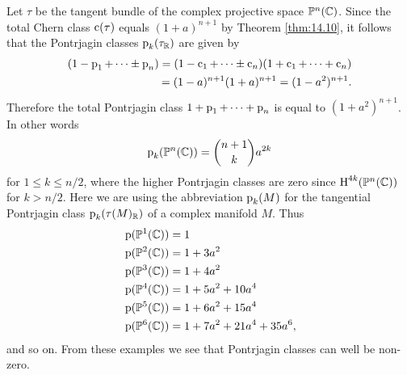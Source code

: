 \documentclass[../main]{subfiles}
\begin{document}
\begin{customexample}{15.6}
\label{ex:15.06}
Let $\tau$ be the tangent bundle of the complex projective space $\mathbb{P}^n(\mathbb C)$. Since the total Chern class $\operatorname{c}(\tau)$ equals $(1+a)^{n+1}$ by Theorem \ref{thm:14.10}, it follows that  the Pontrjagin classes $\operatorname{p}_k(\tau_\mathbb R)$ are given by \[\begin{split}(1-\operatorname{p}_1+\cdots \pm \operatorname{p}_n) = (1-\operatorname{c}_1 + \cdots \pm \operatorname{c}_n)(1+\operatorname{c}_1+\cdots+\operatorname{c}_n) \\ = (1-a)^{n+1}(1+a)^{n+1} = (1-a^2)^{n+1}. \end{split}\] Therefore the total Pontrjagin class $1+\operatorname{p}_1+\cdots+\operatorname{p}_n$ is equal to $(1+a^2)^{n+1}$. In other words 
\[\operatorname{p}_k(\mathbb{P}^n(\mathbb C)) = \binom{n+1}{k} a^{2k}\] for $1 \leq k \leq n/2$, where the higher Pontrjagin classes are zero since $\operatorname{H}^{4k}(\mathbb{P}^n(\mathbb C))$ for $k > n/2$. Here we are using the abbreviation $\operatorname{p}_k(M)$ for the tangential Pontrjagin class $\operatorname{p}_k(\tau(M)_\mathbb R)$ of a complex manifold $M$. Thus 
\[\begin{split} &\operatorname{p}(\mathbb{P}^1(\mathbb C)) = 1 \\ &\operatorname{p}(\mathbb{P}^2(\mathbb C)) = 1 +3a^2 \\ &\operatorname{p}(\mathbb{P}^3(\mathbb C)) = 1 + 4a^2 \\ &\operatorname{p}(\mathbb{P}^4(\mathbb C)) = 1 + 5a^2 + 10a^4 \\ &\operatorname{p}(\mathbb{P}^5(\mathbb C)) = 1 + 6a^2 + 15a^4 \\ &\operatorname{p}(\mathbb{P}^6(\mathbb C))  = 1 + 7a^2 + 21a^4 + 35a^6, \end{split}\] and so on. From these examples we see that Pontrjagin classes can well be non-zero.
\end{customexample}
\end{document}
